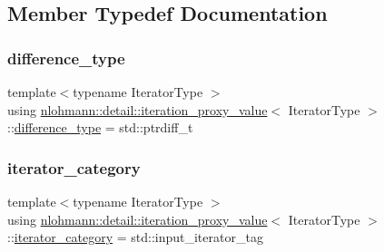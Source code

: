 \subsection{Member Typedef Documentation}
\mbox{\label{classnlohmann_1_1detail_1_1iteration__proxy__value_ada6b4e6d55d8ed7ac79e49a03e9d1fe2}} 
\subsubsection{\texorpdfstring{difference\+\_\+type}{difference\_type}}
{\footnotesize\ttfamily template$<$typename Iterator\+Type $>$ \\
using \hyperlink{classnlohmann_1_1detail_1_1iteration__proxy__value}{nlohmann\+::detail\+::iteration\+\_\+proxy\+\_\+value}$<$ Iterator\+Type $>$\+::\hyperlink{classnlohmann_1_1detail_1_1iteration__proxy__value_ada6b4e6d55d8ed7ac79e49a03e9d1fe2}{difference\+\_\+type} =  std\+::ptrdiff\+\_\+t}

\mbox{\label{classnlohmann_1_1detail_1_1iteration__proxy__value_a1ab8c44e3772c03651b5ad07216043cf}} 
\subsubsection{\texorpdfstring{iterator\+\_\+category}{iterator\_category}}
{\footnotesize\ttfamily template$<$typename Iterator\+Type $>$ \\
using \hyperlink{classnlohmann_1_1detail_1_1iteration__proxy__value}{nlohmann\+::detail\+::iteration\+\_\+proxy\+\_\+value}$<$ Iterator\+Type $>$\+::\hyperlink{classnlohmann_1_1detail_1_1iteration__proxy__value_a1ab8c44e3772c03651b5ad07216043cf}{iterator\+\_\+category} =  std\+::input\+\_\+iterator\+\_\+tag}


